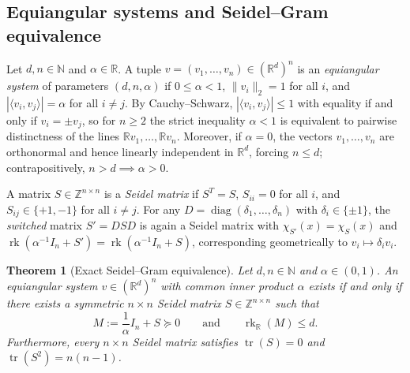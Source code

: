 \documentclass[11pt,reqno]{amsart}
\newtheorem{theorem}{Theorem}[section]
\theoremstyle{definition}
\theoremstyle{remark}
\numberwithin{equation}{section}
\numberwithin{table}{section}
\DeclareMathOperator{\tr}{tr}
\DeclareMathOperator{\rk}{rk}
\DeclareMathOperator{\diag}{diag}
\begin{document}
\subsection{Equiangular systems and Seidel--Gram equivalence}
Let $d, n \in \mathbb{N}$ and $\alpha \in \mathbb{R}$. A tuple $v = (v_1, \dots, v_n) \in (\mathbb{R}^d)^n$ is an \emph{equiangular system} of parameters $(d, n, \alpha)$ if $0 \le \alpha < 1$, $\|v_i\|_2 = 1$ for all $i$, and $|\langle v_i, v_j \rangle| = \alpha$ for all $i \neq j$. By Cauchy--Schwarz, $|\langle v_i, v_j \rangle| \le 1$ with equality if and only if $v_i = \pm v_j$, so for $n \ge 2$ the strict inequality $\alpha < 1$ is equivalent to pairwise distinctness of the lines $\mathbb{R}v_1, \dots, \mathbb{R}v_n$. Moreover, if $\alpha = 0$, the vectors $v_1, \dots, v_n$ are orthonormal and hence linearly independent in $\mathbb{R}^d$, forcing $n \le d$; contrapositively, $n > d \implies \alpha > 0$.

A matrix $S \in \mathbb{Z}^{n \times n}$ is a \emph{Seidel matrix} if $S^T = S$, $S_{ii} = 0$ for all $i$, and $S_{ij} \in \{+1, -1\}$ for all $i \neq j$. For any $D = \diag(\delta_1, \dots, \delta_n)$ with $\delta_i \in \{\pm 1\}$, the \emph{switched} matrix $S' = D S D$ is again a Seidel matrix with $\chi_{S'}(x) = \chi_S(x)$ and $\rk(\alpha^{-1}I_n + S') = \rk(\alpha^{-1}I_n + S)$, corresponding geometrically to $v_i \mapsto \delta_i v_i$.

\begin{theorem}[Exact Seidel--Gram equivalence]\label{thm:seidel_gram}
Let $d, n \in \mathbb{N}$ and $\alpha \in (0, 1)$. An equiangular system $v \in (\mathbb{R}^d)^n$ with common inner product $\alpha$ exists if and only if there exists a symmetric $n \times n$ Seidel matrix $S \in \mathbb{Z}^{n \times n}$ such that
\[
  M := \frac{1}{\alpha} I_n + S \succeq 0 \qquad \text{and} \qquad \rk_{\mathbb{R}}(M) \le d.
\]
Furthermore, every $n \times n$ Seidel matrix satisfies $\tr(S) = 0$ and $\tr(S^2) = n(n - 1)$.
\end{theorem}
\end{document}
